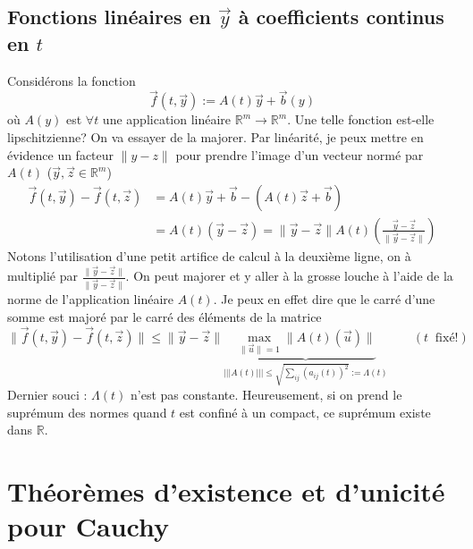 	\subsection{Fonctions linéaires en $\vec{y}$ à coefficients continus en $t$}
	Considérons la fonction
	\begin{equation}
	\vec{f}(t,\vec{y}) := A(t)\vec{y} + \vec{b}(y)
	\end{equation}
	où $A(y)$ est $\forall t$ une application linéaire $\mathbb{R}^m\rightarrow
	\mathbb{R}^m$. Une telle fonction est-elle lipschitzienne? On va essayer de 
	la majorer. Par linéarité, je peux mettre en évidence un facteur $\|y-z\|$ 
	pour prendre l'image d'un vecteur normé par $A(t)$ ($\vec{y},\vec{z}\in 
	\mathbb{R}^m$)
	\begin{equation}
	\begin{array}{ll}
	\vec{f}(t,\vec{y}) - \vec{f}(t,\vec{z}) &= A(t)\vec{y}+\vec{b}-(A(t)\vec{z}+\vec{b})\\
	 &= A(t)(\vec{y}-\vec z) = \|\vec{y}-\vec{z}\|A(t)\left(\frac{\vec{y}- 
	 \vec{z}}{\|\vec{y}-\vec{z}\|}\right)
	\end{array}
	\end{equation}
	Notons l'utilisation d'une petit artifice de calcul à la deuxième ligne, on à 
	multiplié par $\frac{\|\vec y - \vec{z}\|}{\|\vec y - \vec{z}\|}.$
	On peut majorer et y aller à la grosse louche à l'aide de la norme de l'application 
	linéaire $A(t)$. Je peux en effet dire que le carré d'une somme est majoré par le 
	carré des éléments de la matrice
	\begin{equation}
	\|\vec{f}(t,\vec{y}) - \vec{f}(t,\vec{z})\| \leq \|\vec{y}-\vec{z}\| \underbrace{
	\max_{\|\vec{u}\| = 1}
	\|A(t)(\vec{u})\|}_{|||A(t)||| \leq \sqrt{\sum_{ij} (a_{ij}(t))^2} := \Lambda(t)}
	\qquad (t\ \text{ fixé!})
	\end{equation}
	Dernier souci : $\Lambda(t)$ n'est pas constante. Heureusement, si on prend le 
	suprémum des normes quand $t$ est confiné à un compact, ce suprémum existe dans 
	$\mathbb{R}$.
	

\section{Théorèmes d'existence et d'unicité pour Cauchy}
